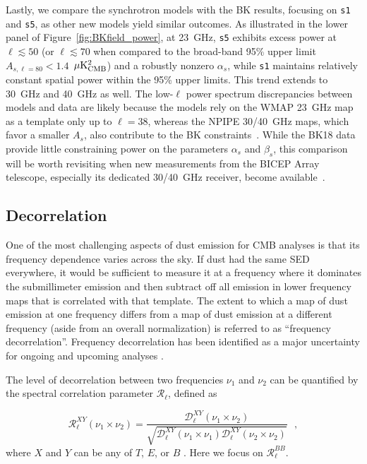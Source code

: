 \documentclass[twocolumn]{aastex631}
\begin{document}
Lastly, we compare the synchrotron models with the BK results, focusing on \texttt{s1} and \texttt{s5}, as other new models yield similar outcomes. As illustrated in the lower panel of Figure~\ref{fig:BKfield_power}, at 23~GHz, \texttt{s5} exhibits excess power at $\ell \lesssim 50$ (or $\ell \lesssim 70$ when compared to the broad-band 95\% upper limit $A_{s,\ell=80} < 1.4$~$\mu\rm{K^2_{CMB}}$) and a robustly nonzero $\alpha_s$, while \texttt{s1} maintains relatively constant spatial power within the 95\% upper limits. This trend extends to 30~GHz and 40~GHz as well. The low-$\ell$ power spectrum discrepancies between models and data are likely because the models rely on the WMAP 23~GHz map as a template only up to $\ell = 38$, whereas the NPIPE 30/40~GHz maps, which favor a smaller $A_s$, also contribute to the BK constraints~\citep[][Figure~21]{Ade:2021}. While the BK18 data provide little constraining power on the parameters $\alpha_s$ and $\beta_s$, this comparison will be worth revisiting when new measurements from the BICEP Array telescope, especially its dedicated 30/40~GHz receiver, become available~\citep{Moncelsi:2020}.

\subsection{Decorrelation} \label{subsec:decorrelation}

One of the most challenging aspects of dust emission for CMB analyses is that its frequency dependence varies across the sky. If dust had the same SED everywhere, it would be sufficient to measure it at a frequency where it dominates the submillimeter emission and then subtract off all emission in lower frequency maps that is correlated with that template. The extent to which a map of dust emission at one frequency differs from a map of dust emission at a different frequency (aside from an overall normalization) is referred to as ``frequency decorrelation''. Frequency decorrelation has been identified as a major uncertainty for ongoing and upcoming analyses \citep{Ade:2021}.

The level of decorrelation between two frequencies $\nu_1$ and $\nu_2$ can be quantified by the spectral correlation parameter $\mathcal{R}_\ell$, defined as

\begin{equation} \label{eq:R_ell}
    \mathcal{R}^{XY}_\ell(\nu_1\times\nu_2) = \frac{\mathcal{D}_\ell^{XY}(\nu_1\times\nu_2)}{\sqrt{\mathcal{D}_\ell^{XY}(\nu_1\times\nu_1)\mathcal{D}_\ell^{XY}(\nu_2\times\nu_2)}}
    ~~~,
\end{equation}
where $X$ and $Y$ can be any of $T$, $E$, or $B$ \citep{planck2016-L}. Here we focus on $\mathcal{R}_\ell^{BB}$.
\end{document}
